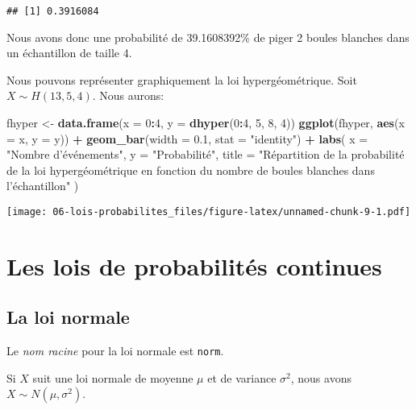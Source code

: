 \documentclass[]{book}
\newenvironment{Shaded}{\begin{snugshade}}{\end{snugshade}}
\newcommand{\KeywordTok}[1]{\textcolor[rgb]{0.13,0.29,0.53}{\textbf{#1}}}
\newcommand{\DataTypeTok}[1]{\textcolor[rgb]{0.13,0.29,0.53}{#1}}
\newcommand{\DecValTok}[1]{\textcolor[rgb]{0.00,0.00,0.81}{#1}}
\newcommand{\FloatTok}[1]{\textcolor[rgb]{0.00,0.00,0.81}{#1}}
\newcommand{\StringTok}[1]{\textcolor[rgb]{0.31,0.60,0.02}{#1}}
\newcommand{\OperatorTok}[1]{\textcolor[rgb]{0.81,0.36,0.00}{\textbf{#1}}}
\newcommand{\NormalTok}[1]{#1}
\begin{document}
\begin{verbatim}
## [1] 0.3916084
\end{verbatim}

Nous avons donc une probabilité de 39.1608392\% de piger 2 boules
blanches dans un échantillon de taille 4.

Nous pouvons représenter graphiquement la loi hypergéométrique. Soit
\(X\sim H(13,5,4)\). Nous aurons:

\begin{Shaded}
\begin{Highlighting}[]
\NormalTok{fhyper <-}\StringTok{ }\KeywordTok{data.frame}\NormalTok{(}\DataTypeTok{x =} \DecValTok{0}\OperatorTok{:}\DecValTok{4}\NormalTok{, }\DataTypeTok{y =} \KeywordTok{dhyper}\NormalTok{(}\DecValTok{0}\OperatorTok{:}\DecValTok{4}\NormalTok{, }\DecValTok{5}\NormalTok{, }\DecValTok{8}\NormalTok{, }\DecValTok{4}\NormalTok{))}
\KeywordTok{ggplot}\NormalTok{(fhyper, }\KeywordTok{aes}\NormalTok{(}\DataTypeTok{x =}\NormalTok{ x, }\DataTypeTok{y =}\NormalTok{ y)) }\OperatorTok{+}
\StringTok{  }\KeywordTok{geom_bar}\NormalTok{(}\DataTypeTok{width =} \FloatTok{0.1}\NormalTok{, }\DataTypeTok{stat =} \StringTok{"identity"}\NormalTok{) }\OperatorTok{+}
\StringTok{  }\KeywordTok{labs}\NormalTok{(}
    \DataTypeTok{x =} \StringTok{"Nombre d'événements"}\NormalTok{,}
    \DataTypeTok{y =} \StringTok{"Probabilité"}\NormalTok{,}
    \DataTypeTok{title =} \StringTok{"Répartition de la probabilité de la loi hypergéométrique en fonction du nombre de boules blanches dans l'échantillon"}
\NormalTok{  )}
\end{Highlighting}
\end{Shaded}

\texttt{[image: 06-lois-probabilites\_files/figure-latex/unnamed-chunk-9-1.pdf]}

\section{Les lois de probabilités
continues}\label{les-lois-de-probabilites-continues}

\subsection{La loi normale}\label{la-loi-normale}

Le \emph{nom racine} pour la loi normale est \texttt{norm}.

Si \(X\) suit une loi normale de moyenne \(\mu\) et de variance
\(\sigma^2\), nous avons \(X\sim N(\mu,\sigma^2)\).
\end{document}
